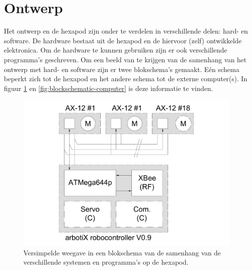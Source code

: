 \documentclass[10pt,a4paper]{article}
\begin{document}
\newpage

\section{Ontwerp}
Het ontwerp en de hexapod zijn onder te verdelen in verschillende delen: hard- en software. De hardware bestaat uit de hexapod en de hiervoor (zelf) ontwikkelde elektronica. Om de hardware te kunnen gebruiken zijn er ook verschillende programma's geschreven. Om een beeld van te krijgen van de samenhang van het ontwerp met hard- en software zijn er twee blokschema's gemaakt. E\'en schema beperkt zich tot de hexapod en het andere schema tot de externe computer(s). In figuur \ref{fig:blockschematic-spider} en \ref{fig:blockschematic-computer} is deze informatie te vinden.

\begin{figure}[h]
    \centering
    \includegraphics[width=1\textwidth]{blockschematic-spider}
    \caption{Versimpelde weegave in een blokschema van de samenhang van de verschillende systemen en programma's op de hexapod.}
    \label{fig:blockschematic-spider}
\end{figure}
\end{document}
